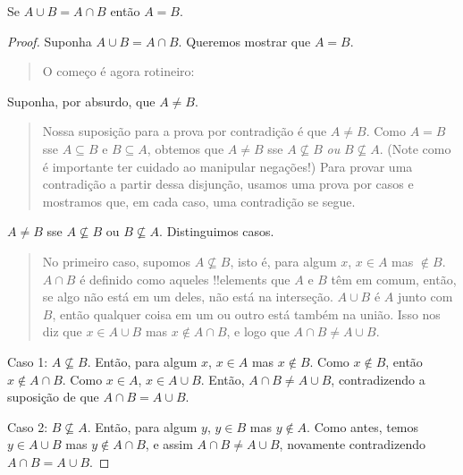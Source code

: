 \documentclass[../../../include/open-logic-section]{subfiles}
\begin{document}
\begin{prop}
Se $A \cup B = A \cap B$ então $A = B$.
\end{prop}

\begin{proof}
  Suponha $A \cup B = A \cap B$. Queremos mostrar que $A = B$.
  \begin{quote}
    O começo é agora rotineiro:
  \end{quote}
  Suponha, por absurdo, que $A \neq B$.
  \begin{quote}
    Nossa suposição para a prova por contradição é que $A \neq
    B$. Como $A = B$ sse $A \subseteq B$ e $B \subseteq A$, obtemos
    que $A \neq B$ sse $A \nsubseteq B$ \emph{ou} $B \nsubseteq
    A$. (Note como é importante ter cuidado ao manipular
    negações!{}) Para provar uma contradição a partir dessa disjunção,
    usamos uma prova por casos e mostramos que, em cada caso, uma contradição
    se segue.
  \end{quote}
  $A \neq B$ sse $A \nsubseteq B$ ou $B \nsubseteq A$. Distinguimos
  casos.
  \begin{quote}
    No primeiro caso, supomos $A \nsubseteq B$, isto é, para algum $x$,
    $x \in A$ mas $\notin B$. $A \cap B$ é definido como aqueles
    !!{element}s que $A$ e $B$ têm em comum, então, se algo
    não está em um deles, não está na interseção. $A \cup B$ é
    $A$ junto com $B$, então qualquer coisa em um ou outro está também na
    união. Isso nos diz que $x \in A \cup B$ mas $x \notin A \cap
    B$, e logo que $A \cap B \neq A \cup B$.
  \end{quote}
  
  Caso 1: $A \nsubseteq B$. Então, para algum $x$, $x \in A$ mas $x \notin
  B$. Como $x \notin B$, então $x \notin A \cap B$. Como $x \in A$,
  $x \in A \cup B$. Então, $A \cap B \neq A \cup B$, contradizendo a
  suposição de que $A \cap B = A \cup B$.

  Caso 2: $B \nsubseteq A$. Então, para algum $y$, $y \in B$ mas $y \notin
  A$. Como antes, temos $y \in A \cup B$ mas $y \notin A \cap B$, e
  assim $A \cap B \neq A \cup B$, novamente contradizendo $A \cap B = A \cup
  B$. 
\end{proof}
\end{document}
